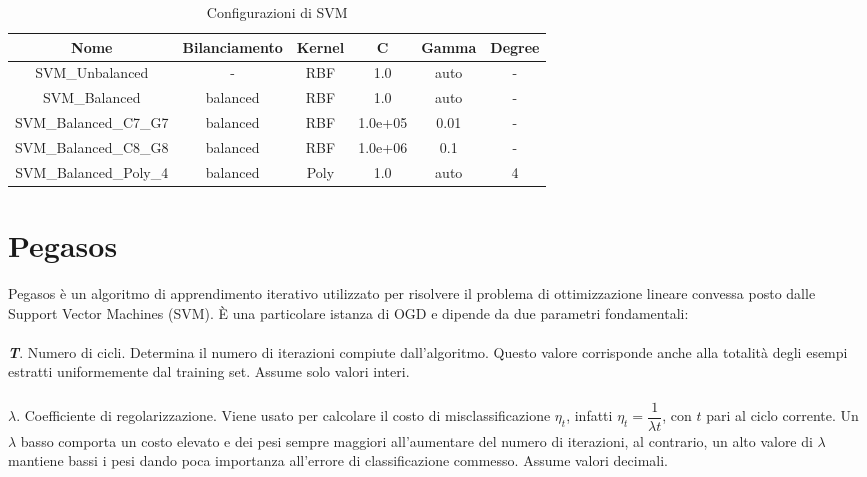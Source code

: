 \begin{table}[ht]%
\centering
\caption{Configurazioni di SVM}\label{tab:b2}
\begin{tabular}{|c|c|c|S[table-parse-only = true]|S[table-parse-only = true]|c|}
\hline
Nome                    & Bilanciamento & Kernel & C        & Gamma & Degree    \\ 
\hline 
SVM\_Unbalanced         & -             & RBF    & 1.0      & auto    & -       \\
\hline 
SVM\_Balanced           & balanced      & RBF    & 1.0      & auto    & -       \\
\hline 
SVM\_Balanced\_C7\_G7   & balanced      & RBF    & 1.0e+05  & 0.01    & -       \\
\hline 
SVM\_Balanced\_C8\_G8   & balanced      & RBF    & 1.0e+06  & 0.1     & -       \\
\hline 
SVM\_Balanced\_Poly\_4  & balanced      & Poly   & 1.0      & auto    & 4       \\
\hline 
\end{tabular} 
\end{table}

\section{Pegasos}
Pegasos è un algoritmo di apprendimento iterativo utilizzato per risolvere il problema di ottimizzazione lineare convessa posto dalle Support Vector Machines (SVM).
È una particolare istanza di OGD e dipende da due parametri fondamentali:

\paragraph*{}
\textbf{\textit{T}}. Numero di cicli. Determina il numero di iterazioni compiute dall'algoritmo. Questo valore corrisponde anche alla totalità degli esempi estratti uniformemente dal training set. Assume solo valori interi.

\paragraph*{}
$\mathbf{\mathit{\lambda}}$. Coefficiente di regolarizzazione. Viene usato per calcolare il costo di misclassificazione $\eta_t$, infatti $\eta_t = \dfrac{1}{\lambda t}$, con $t$ pari al ciclo corrente. Un $\lambda$ basso comporta un costo elevato e dei pesi sempre maggiori all'aumentare del numero di iterazioni, al contrario, un alto valore di $\lambda$ mantiene bassi i pesi dando poca importanza all'errore di classificazione commesso. Assume valori decimali.


